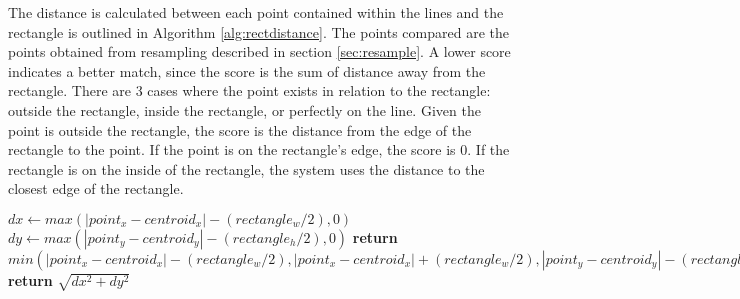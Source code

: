



The distance is calculated between each point contained within the lines and the rectangle is outlined in Algorithm \ref{alg:rectdistance}. The points compared are the points obtained from resampling described in section \ref{sec:resample}. A lower score indicates a better match, since the score is the sum of distance away from the rectangle. There are 3 cases where the point exists in relation to the rectangle: outside the rectangle, inside the rectangle, or perfectly on the line. Given the point is outside the rectangle, the score is the distance from the edge of the rectangle to the point. If the point is on the rectangle's edge, the score is 0. If the rectangle is on the inside of the rectangle, the system uses the distance to the closest edge of the rectangle. \\

\begin{algorithm}
\caption{Rect-Distance(centroid, rectangle, point)}
\label{alg:rectdistance}
\begin{algorithmic}[1]
\State $dx \gets max(|point_x - centroid_x|-(rectangle_w/2), 0)$
\State $dy \gets max(|point_y - centroid_y|-(rectangle_h/2), 0)$
    \State \textbf{return}
    $min(|point_x - centroid_x|-(rectangle_w/2),
    |point_x - centroid_x|+(rectangle_w/2),
    |point_y - centroid_y|-(rectangle_h/2),
    |point_y - centroid_y|+(rectangle_h/2))$
\Else
    \State \textbf{return} $\sqrt{dx^2 + dy^2}$
\EndIf
\end{algorithmic}
\end{algorithm}

